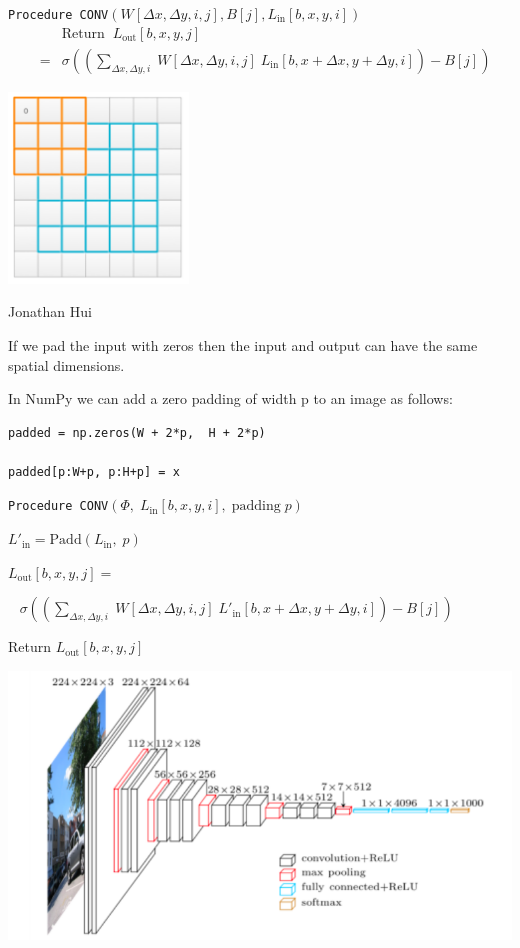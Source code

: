 {\vfill
{\tt Procedure CONV}$(W[\Delta x, \Delta y, i, j], B[j], L_{\mathrm{in}}[b,x,y,i])$
\begin{eqnarray*}
 & &  \mbox{Return}\;\;L_{\mathrm{out}}[b,x,y,j] \\
 & = &   \sigma\left(\left(\sum_{\Delta x, \Delta y, i}\;W[\Delta x, \Delta y, i,j]\; L_{\mathrm{in}}[b,x + \Delta x, y + \Delta y, i]\right) - B[j]\right)
\end{eqnarray*}


\centerline{\includegraphics[height = 2.0in]{../images/padding2}}
\centerline{\large Jonathan Hui}

\vfill
If we pad the input with zeros then the input and output can have the same spatial dimensions.


In NumPy we can add a zero padding of width p to an image as follows:

\vfill
\begin{verbatim}
padded = np.zeros(W + 2*p,  H + 2*p)

padded[p:W+p, p:H+p] = x
\end{verbatim}


{\tt Procedure CONV}$(\Phi,\; L_{\mathrm{in}}[b,x,y,i],\;\mathrm{padding}\;p)$

\vfill
$L'_{\mathrm{in}} = \mathrm{Padd}(L_{\mathrm{in}},\;p)$

\vfill
$L_{\mathrm{out}}[b,x,y,j] =$

\vfill
$\;\;\;\sigma\left(\left(\sum_{\Delta x, \Delta y, i}\;W[\Delta x, \Delta y, i,j]\;L'_{\mathrm{in}}[b,x + \Delta x, y + \Delta y, i]\right) - B[j] \right)$


\vfill
Return $L_{\mathrm{out}}[b,x,y,j]$


\centerline{\includegraphics[width = 8.0in]{../images/VGG}}

}
